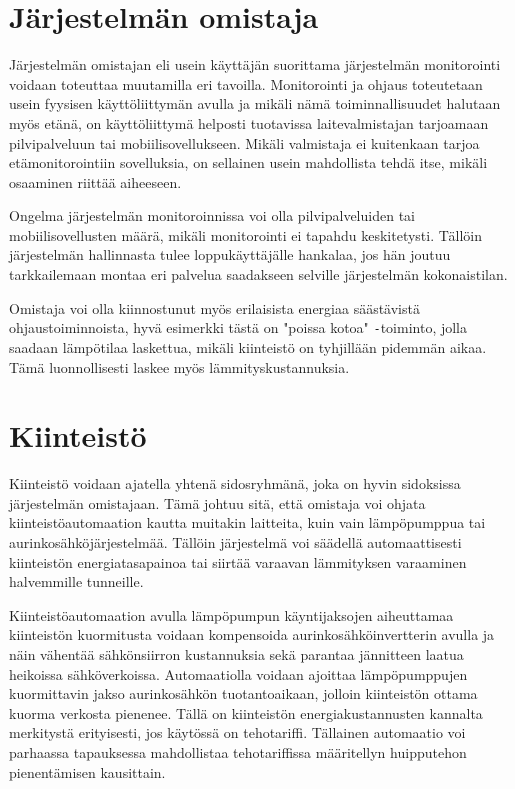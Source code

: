 \section{Järjestelmän omistaja}

  Järjestelmän omistajan eli usein käyttäjän suorittama järjestelmän monitorointi voidaan toteuttaa muutamilla eri tavoilla. Monitorointi ja ohjaus toteutetaan usein fyysisen käyttöliittymän avulla ja mikäli nämä toiminnallisuudet halutaan myös etänä, on käyttöliittymä helposti tuotavissa laitevalmistajan tarjoamaan pilvipalveluun tai mobiilisovellukseen. Mikäli valmistaja ei kuitenkaan tarjoa etämonitorointiin sovelluksia, on sellainen usein mahdollista tehdä itse, mikäli osaaminen riittää aiheeseen.

  Ongelma järjestelmän monitoroinnissa voi olla pilvipalveluiden tai mobiilisovellusten määrä, mikäli monitorointi ei tapahdu keskitetysti. Tällöin järjestelmän hallinnasta tulee loppukäyttäjälle hankalaa, jos hän joutuu tarkkailemaan montaa eri palvelua saadakseen selville järjestelmän kokonaistilan.

  Omistaja voi olla kiinnostunut myös erilaisista energiaa säästävistä ohjaustoiminnoista, hyvä esimerkki tästä on "poissa kotoa"{} \texttt{-}toiminto, jolla saadaan lämpötilaa laskettua, mikäli kiinteistö on tyhjillään pidemmän aikaa. Tämä luonnollisesti laskee myös lämmityskustannuksia.

\section{Kiinteistö}
  Kiinteistö voidaan ajatella yhtenä sidosryhmänä, joka on hyvin sidoksissa järjestelmän omistajaan.  Tämä johtuu sitä, että omistaja voi ohjata kiinteistöautomaation kautta muitakin laitteita, kuin vain lämpöpumppua tai aurinkosähköjärjestelmää. Tällöin järjestelmä voi säädellä automaattisesti kiinteistön energiatasapainoa tai siirtää varaavan lämmityksen varaaminen halvemmille tunneille.

  Kiinteistöautomaation avulla lämpöpumpun käyntijaksojen aiheuttamaa kiinteistön kuormitusta voidaan kompensoida aurinkosähköinvertterin avulla ja näin vähentää sähkönsiirron kustannuksia sekä parantaa jännitteen laatua heikoissa sähköverkoissa. Automaatiolla voidaan ajoittaa lämpöpumppujen kuormittavin jakso aurinkosähkön tuotantoaikaan, jolloin kiinteistön ottama kuorma verkosta pienenee. Tällä on kiinteistön energiakustannusten kannalta merkitystä erityisesti, jos käytössä on tehotariffi. Tällainen automaatio voi parhaassa tapauksessa mahdollistaa tehotariffissa määritellyn huipputehon pienentämisen kausittain.


